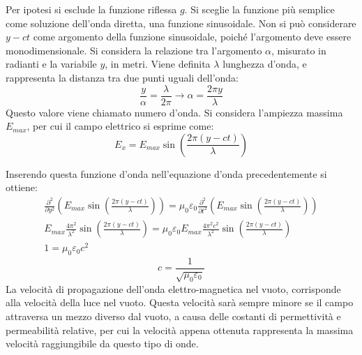 \documentclass{article}
\numberwithin{equation}{subsection}
\begin{document}
Per ipotesi si esclude la funzione riflessa $g$. Si sceglie la funzione più semplice come soluzione dell'onda diretta, una funzione sinusoidale. Non si può considerare $y-ct$ 
come argomento della funzione sinusoidale, poiché l'argomento deve essere monodimensionale. Si considera la relazione tra l'argomento $\alpha$, misurato in radianti e la 
variabile $y$, in metri. Viene definita $\lambda$ lunghezza d'onda, e rappresenta la distanza tra due punti uguali dell'onda: 
\begin{equation*}
    \displaystyle\frac{y}{\alpha}=\frac{\lambda}{2\pi}\to\alpha=\frac{2\pi y}{\lambda}
\end{equation*}
Questo valore viene chiamato numero d'onda. Si considera l'ampiezza massima $E_{max}$, per cui il campo elettrico si esprime come:
\begin{equation}
    E_x=E_{max}\sin\left(\displaystyle\frac{2\pi (y-ct)}{\lambda}\right)
\end{equation}

Inserendo questa funzione d'onda nell'equazione d'onda precedentemente si ottiene:
\begin{gather*}
    \displaystyle\frac{\partial^2}{\partial y^2}\left(E_{max}\sin\left(\displaystyle\frac{2\pi (y-ct)}{\lambda}\right)\right)=\mu_0\varepsilon_0\frac{\partial^2}{\partial t^2}\left(E_{max}\sin\left(\displaystyle\frac{2\pi (y-ct)}{\lambda}\right)\right)\\
    \displaystyle E_{max}\frac{4\pi^2}{\lambda^2}\sin\left(\frac{2\pi (y-ct)}{\lambda}\right)=\mu_0\varepsilon_0E_{max}\frac{4\pi^2c^2}{\lambda^2}\sin\left(\frac{2\pi (y-ct)}{\lambda}\right)\\
    1=\mu_0\varepsilon_0c^2
\end{gather*}
\begin{equation}
    c=\displaystyle\frac{1}{\sqrt{\mu_0\varepsilon_0}}
\end{equation}
La velocità di propagazione dell'onda elettro-magnetica nel vuoto, corrisponde alla velocità della luce nel vuoto. Questa velocità sarà sempre minore se il campo attraversa 
un mezzo diverso dal vuoto, a causa delle costanti di permettività e permeabilità relative, per cui la velocità appena ottenuta rappresenta la massima velocità raggiungibile 
da questo tipo di onde. 

\begin{center}
\end{center}
\end{document}

